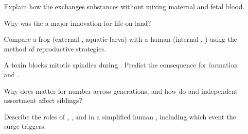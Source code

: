 \begin{exercise}[$\star\star$]\label{exo:g12:reproduction-development:8}
Explain how the  exchanges substances without mixing maternal
and fetal blood.
\end{exercise}

\begin{exercise}[$\star\star$]\label{exo:g12:reproduction-development:9}
Why was the  a major innovation for life on land?
\end{exercise}

\begin{exercise}[$\star\star\star$]\label{exo:g12:reproduction-development:10}
Compare a frog (external , aquatic larva) with a human
(internal , ) using the method of reproductive
strategies.
\end{exercise}

\begin{exercise}[$\star\star\star$]\label{exo:g12:reproduction-development:11}
A toxin blocks mitotic spindles during . Predict the consequence
for  formation and .
\end{exercise}

\begin{exercise}[$\star\star\star$]\label{exo:g12:reproduction-development:12}
Why does  matter for  number across generations, and
how do  and independent assortment affect siblings?
\end{exercise}

\begin{exercise}[$\star\star$]\label{exo:g12:reproduction-development:13}
Describe the roles of , ,  and  in a simplified
human , including which event the  surge triggers.
\end{exercise}

